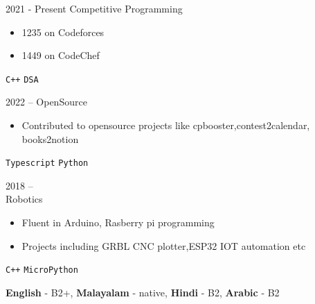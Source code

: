 \documentclass[9pt]{developercv} %
\begin{document}
\vspace{-10 pt}
\begin{entrylist}
    \entry
    {2021 - Present}
    {Competitive Programming}
    {}
    {\vspace{-10pt}
        \begin{itemize}[noitemsep,topsep=0pt,parsep=0pt,partopsep=0pt, leftmargin=-1pt]
            \item {1235 on Codeforces}
            \item {1449 on CodeChef}
        \end{itemize}
        \texttt{C++} \slashsep \texttt{DSA}}
    \entry
    {2022 -- }
    {OpenSource}
    {}
    {\vspace{-10pt}
        \begin{itemize}[noitemsep,topsep=0pt,parsep=0pt,partopsep=0pt, leftmargin=-1pt]
            \item {Contributed to opensource projects like cpbooster,contest2calendar, books2notion}
        \end{itemize}
        \texttt{Typescript} \slashsep \texttt{Python}}
    \entry
    {2018 --  \\\footnotesize{}}
    {Robotics}
    {}
    {\vspace{-10pt}
        \begin{itemize}[noitemsep,topsep=0pt,parsep=0pt,partopsep=0pt, leftmargin=-1pt]
            \item {Fluent in Arduino, Rasberry pi programming}
            \item {Projects including GRBL CNC plotter,ESP32 IOT automation etc}
        \end{itemize}
        \texttt{C++} \slashsep \texttt{MicroPython}}
\end{entrylist}

\vspace{-10 pt}
\vspace{-6pt}

\hspace{26mm} \textbf{English} - B2+, \textbf{ Malayalam} - native, \textbf{Hindi} - B2, \textbf{Arabic} - B2

\end{document}
